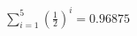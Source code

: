 \documentclass[preview]{standalone}
\begin{document}
\begin{align*}
\sum_{i=1}^{5} (\frac{1}{2})^i = {0.96875}
\end{align*}
\end{document}
